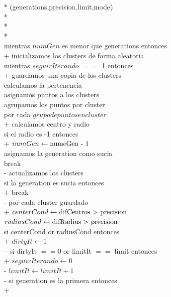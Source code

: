 \documentclass[conference,a4paper]{IEEEtran}
\begin{document}
\begin{figure}[H]
\begin{pseudo}*
(generations,precision,limit,mode) \\*
\\*
\\*
 \\
mientras \( numGen \) \textnormal{es menor que generations} entonces \\+
inicializamos los clusters de forma aleatoria \\
mientras \( seguirIterando\) \textnormal{ $==$ 1 } entonces \\+
guardamos una copia de los clusters\\
calculamos la pertenencia\\
asignamos puntos a los clusters\\
agrupamos los puntos por cluster\\
por cada \( grupo de puntos en cluster \) \\+
calculamos centro y radio\\
si \textnormal{el radio es -1} entonces\\+
\( numGen \leftarrow \textnormal{numeGen - 1 }\) \\
asignamos la generation como sucia\\
break\\-
actualizamos los clusters\\
si \textnormal{la generation es sucia} entonces\\+
break\\-
por cada \textnormal{cluster guardado}\\+
\( centerCond \leftarrow \textnormal{difCentros $>$ precision} \)\\
\( radiusCond \leftarrow \textnormal{difRadius $>$ precision} \)\\
si \textnormal{centerCond or radiusCond} entonces\\+
\( dirtyIt \leftarrow 1 \) \\--
si \textnormal{dirtyIt $== 0$ or limitIt $==$ limit} entonces\\+
\(seguirIterando \leftarrow 0 \) \\-
\(limitIt \leftarrow limitIt + 1 \)\\-
si \textnormal{generation es la primera} entonces\\+

\end{pseudo}
\end{figure}
\end{document}

